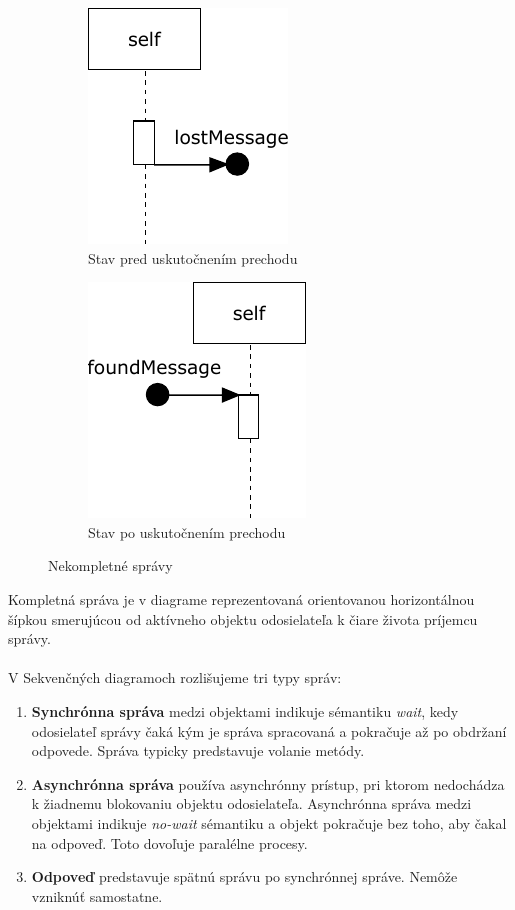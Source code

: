 \begin{figure}[H]
	\centering
	\begin{subfigure}[t]{0.4\textwidth}
		\centering
		\includegraphics[scale=0.75]{obrazky-figures/SD-lost-ex}
		\caption{Stav pred uskutočnením prechodu}
	\end{subfigure}
	\begin{subfigure}[t]{0.4\textwidth}
		\centering
		\includegraphics[scale=0.75]{obrazky-figures/SD-found-ex}
		\caption{Stav po uskutočnením prechodu}
	\end{subfigure}
	\caption{Nekompletné správy}
	\label{fig:uncomplete-mes}
\end{figure}

Kompletná správa je v diagrame reprezentovaná orientovanou horizontálnou šípkou smerujúcou od aktívneho objektu odosielateľa k čiare života príjemcu správy. \\\\
V Sekvenčných diagramoch rozlišujeme tri typy správ:

\begin{enumerate}
	\item \textbf{Synchrónna správa} medzi objektami indikuje  sémantiku \emph{wait}, kedy  odosielateľ správy čaká kým je správa spracovaná a pokračuje až po obdržaní odpovede. Správa typicky predstavuje volanie metódy.
	\item \textbf{Asynchrónna správa} používa asynchrónny prístup, pri ktorom nedochádza k žiadnemu blokovaniu objektu odosielateľa. Asynchrónna správa medzi objektami indikuje \emph{no-wait} sémantiku a objekt pokračuje bez toho, aby čakal na odpoveď. Toto dovoľuje paralélne procesy.
	\item \textbf{Odpoveď} predstavuje spätnú správu po synchrónnej správe. Nemôže vzniknúť samostatne.
\end{enumerate}

